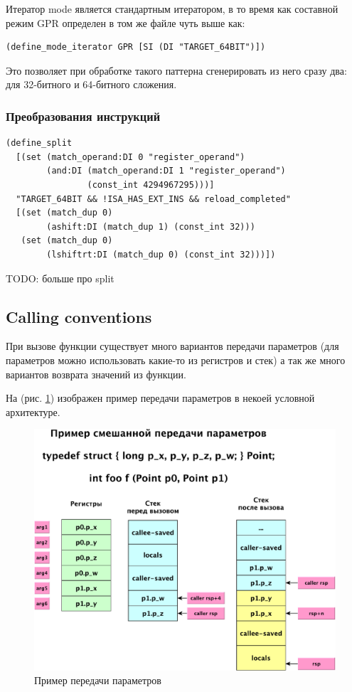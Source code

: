 \documentclass[a4paper,12pt,oneside]{article}
\begin{document}
Итератор mode является стандартным итератором, в то время как составной режим GPR определен в том же файле чуть выше как:

\begin{verbatim}
(define_mode_iterator GPR [SI (DI "TARGET_64BIT")])
\end{verbatim}

Это позволяет при обработке такого паттерна сгенерировать из него сразу два: для 32-битного и 64-битного сложения.

\subsubsection{Преобразования инструкций}

\begin{verbatim}
(define_split
  [(set (match_operand:DI 0 "register_operand")
        (and:DI (match_operand:DI 1 "register_operand")
                (const_int 4294967295)))]
  "TARGET_64BIT && !ISA_HAS_EXT_INS && reload_completed"
  [(set (match_dup 0)
        (ashift:DI (match_dup 1) (const_int 32)))
   (set (match_dup 0)
        (lshiftrt:DI (match_dup 0) (const_int 32)))])
\end{verbatim}

TODO: больше про split

\pagebreak
\subsection{Calling conventions}

При вызове функции существует много вариантов передачи параметров (для параметров можно использовать какие-то из регистров и стек) а так же много вариантов возврата значений из функции. 

На (рис. \ref{fig:abi}) изображен пример передачи параметров в некоей условной архитектуре.

\begin{figure}[ht]
\centering
\includegraphics[width=1.0\textwidth]{illustrations/abi-sample-2-crop.pdf}
\caption{Пример передачи параметров}
\label{fig:abi}
\end{figure}
\end{document}

